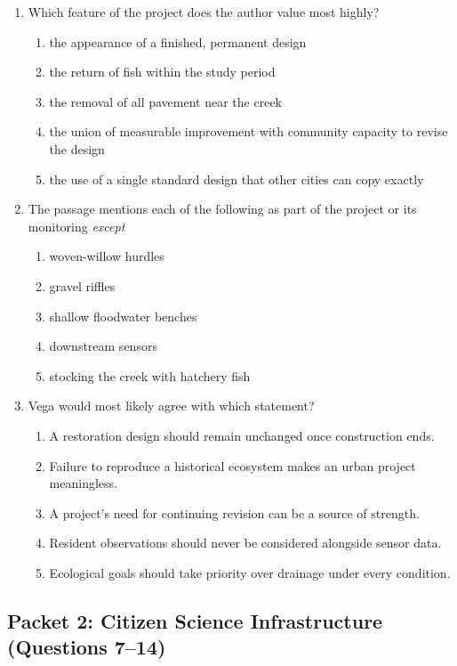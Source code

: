\begin{enumerate}
\item Which feature of the project does the author value most highly?
\begin{enumerate}
\item the appearance of a finished, permanent design
\item the return of fish within the study period
\item the removal of all pavement near the creek
\item the union of measurable improvement with community capacity to revise the design
\item the use of a single standard design that other cities can copy exactly
\end{enumerate}

\item The passage mentions each of the following as part of the project or its monitoring \emph{except}
\begin{enumerate}
\item woven-willow hurdles
\item gravel riffles
\item shallow floodwater benches
\item downstream sensors
\item stocking the creek with hatchery fish
\end{enumerate}

\item Vega would most likely agree with which statement?
\begin{enumerate}
\item A restoration design should remain unchanged once construction ends.
\item Failure to reproduce a historical ecosystem makes an urban project meaningless.
\item A project's need for continuing revision can be a source of strength.
\item Resident observations should never be considered alongside sensor data.
\item Ecological goals should take priority over drainage under every condition.
\end{enumerate}
\end{enumerate}

\subsection*{Packet 2: Citizen Science Infrastructure (Questions 7--14)}

